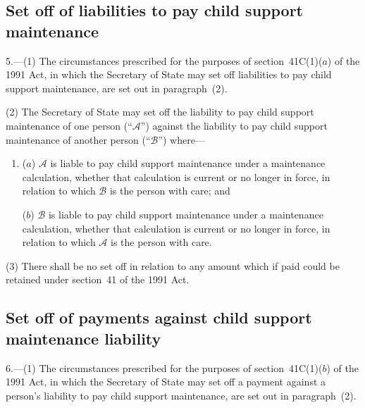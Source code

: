 \documentclass[12pt,a4paper]{article}
\begin{document}
\renewcommand\parthead{--- Part II}

\subsection[5. Set off of liabilities to pay child support maintenance]{Set off of liabilities to pay child support maintenance}

5.---(1)  The circumstances prescribed for the purposes of section~41C(1)($a$)  of the 1991 Act, in which the 
Secretary of State  %
may set off liabilities to pay child support maintenance, are set out in paragraph~(2).

(2) The 
Secretary of State  %
may set off the liability to pay child support maintenance of one person (“$\mathcal{A}$”) against the liability to pay child support maintenance of another person (“$\mathcal{B}$”) where—
\begin{enumerate}\item[]
($a$) $\mathcal{A}$ is liable to pay child support maintenance under a maintenance calculation, whether that calculation is current or no longer in force, in relation to which $\mathcal{B}$ is the person with care; and

($b$) $\mathcal{B}$ is liable to pay child support maintenance under a maintenance calculation, whether that calculation is current or no longer in force, in relation to which $\mathcal{A}$ is the person with care.
\end{enumerate}

(3) There shall be no set off in relation to any amount which if paid could be retained under section~41 of the 1991 Act.


\subsection[6. Set off of payments against child support maintenance liability]{Set off of payments against child support maintenance liability}

6.---(1)  The circumstances prescribed for the purposes of section~41C(1)($b$)  of the 1991 Act, in which the 
Secretary of State  %
may set off a payment against a person’s liability to pay child support maintenance, are set out in paragraph~(2).
\end{document}
